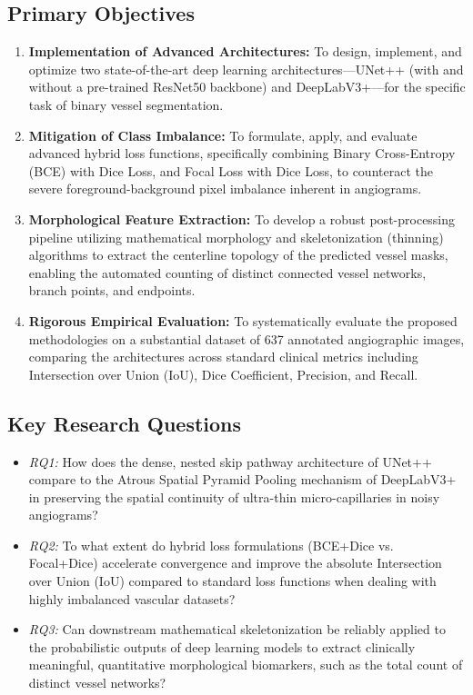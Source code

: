 \subsection{Primary Objectives}
\begin{enumerate}
    \item \textbf{Implementation of Advanced Architectures:} To design, implement, and optimize two state-of-the-art deep learning architectures---UNet++ (with and without a pre-trained ResNet50 backbone) and DeepLabV3+---for the specific task of binary vessel segmentation.
    \item \textbf{Mitigation of Class Imbalance:} To formulate, apply, and evaluate advanced hybrid loss functions, specifically combining Binary Cross-Entropy (BCE) with Dice Loss, and Focal Loss with Dice Loss, to counteract the severe foreground-background pixel imbalance inherent in angiograms.
    \item \textbf{Morphological Feature Extraction:} To develop a robust post-processing pipeline utilizing mathematical morphology and skeletonization (thinning) algorithms to extract the centerline topology of the predicted vessel masks, enabling the automated counting of distinct connected vessel networks, branch points, and endpoints.
    \item \textbf{Rigorous Empirical Evaluation:} To systematically evaluate the proposed methodologies on a substantial dataset of 637 annotated angiographic images, comparing the architectures across standard clinical metrics including Intersection over Union (IoU), Dice Coefficient, Precision, and Recall.
\end{enumerate}

\subsection{Key Research Questions}
\begin{itemize}
    \item \textit{RQ1:} How does the dense, nested skip pathway architecture of UNet++ compare to the Atrous Spatial Pyramid Pooling mechanism of DeepLabV3+ in preserving the spatial continuity of ultra-thin micro-capillaries in noisy angiograms?
    \item \textit{RQ2:} To what extent do hybrid loss formulations (BCE+Dice vs. Focal+Dice) accelerate convergence and improve the absolute Intersection over Union (IoU) compared to standard loss functions when dealing with highly imbalanced vascular datasets?
    \item \textit{RQ3:} Can downstream mathematical skeletonization be reliably applied to the probabilistic outputs of deep learning models to extract clinically meaningful, quantitative morphological biomarkers, such as the total count of distinct vessel networks?
\end{itemize}


